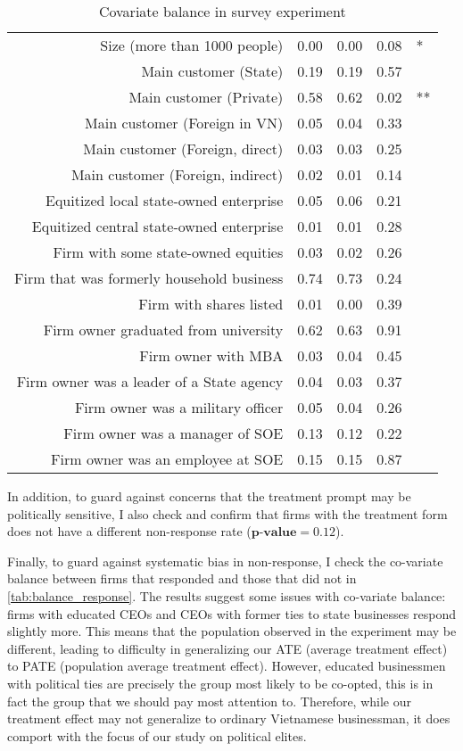 \begin{table}[H]
\begin{tabular}{rrrrl}
  Size (more than 1000 people) & 0.00 & 0.00 & 0.08 & * \\ 
  Main customer (State) & 0.19 & 0.19 & 0.57 &  \\ 
  Main customer (Private) & 0.58 & 0.62 & 0.02 & ** \\ 
  Main customer (Foreign in VN) & 0.05 & 0.04 & 0.33 &  \\ 
  Main customer (Foreign, direct) & 0.03 & 0.03 & 0.25 &  \\ 
  Main customer (Foreign, indirect) & 0.02 & 0.01 & 0.14 &  \\ 
  Equitized local state-owned enterprise & 0.05 & 0.06 & 0.21 &  \\ 
  Equitized central state-owned enterprise & 0.01 & 0.01 & 0.28 &  \\ 
  Firm with some state-owned equities & 0.03 & 0.02 & 0.26 &  \\ 
  Firm that was formerly household business & 0.74 & 0.73 & 0.24 &  \\ 
  Firm with shares listed & 0.01 & 0.00 & 0.39 &  \\ 
  Firm owner graduated from university & 0.62 & 0.63 & 0.91 &  \\ 
  Firm owner with MBA & 0.03 & 0.04 & 0.45 &  \\ 
  Firm owner was a leader of a State agency & 0.04 & 0.03 & 0.37 &  \\ 
  Firm owner was a military officer & 0.05 & 0.04 & 0.26 &  \\ 
  Firm owner was a manager of SOE & 0.13 & 0.12 & 0.22 &  \\ 
  Firm owner was an employee at SOE & 0.15 & 0.15 & 0.87 &  \\ 
   \hline
\end{tabular}
\caption{Covariate balance in survey experiment}
\label{tab:balance}
\end{table}

In addition, to guard against concerns that the treatment prompt may be politically sensitive, I also check and confirm that firms with the treatment form does not have a different non-response rate ($\textbf{p-value} = 0.12$).

Finally, to guard against systematic bias in non-response, I check the co-variate balance between firms that responded and those that did not in \autoref{tab:balance_response}. The results suggest some issues with co-variate balance: firms with educated CEOs and CEOs with former ties to state businesses respond slightly more. This means that the population observed in the experiment may be different, leading to difficulty in generalizing our ATE (average treatment effect) to PATE (population average treatment effect). However, educated businessmen with political ties are precisely the group most likely to be co-opted, this is in fact the group that we should pay most attention to. Therefore, while our treatment effect may not generalize to ordinary Vietnamese businessman, it does comport with the focus of our study on political elites.

